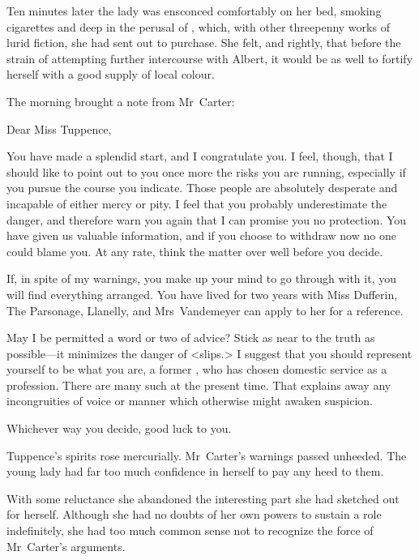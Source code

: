 Ten minutes later the lady was ensconced comfortably on her bed, smoking cigarettes and deep in the perusal of , which, with other threepenny works of lurid fiction, she had sent out to purchase. She felt, and rightly, that before the strain of attempting further intercourse with Albert, it would be as well to fortify herself with a good supply of local colour.

The morning brought a note from Mr~Carter:

\begin{mail}{}{Dear Miss Tuppence,}

You have made a splendid start, and I congratulate you. I feel, though, that I should like to point out to you once more the risks you are running, especially if you pursue the course you indicate. Those people are absolutely desperate and incapable of either mercy or pity. I feel that you probably underestimate the danger, and therefore warn you again that I can promise you no protection. You have given us valuable information, and if you choose to withdraw now no one could blame you. At any rate, think the matter over well before you decide.

If, in spite of my warnings, you make up your mind to go through with it, you will find everything arranged. You have lived for two years with Miss Dufferin, The Parsonage, Llanelly, and Mrs~Vandemeyer can apply to her for a reference.

May I be permitted a word or two of advice? Stick as near to the truth as possible—it minimizes the danger of <slips.> I suggest that you should represent yourself to be what you are, a former , who has chosen domestic service as a profession. There are many such at the present time. That explains away any incongruities of voice or manner which otherwise might awaken suspicion.

Whichever way you decide, good luck to you.

\end{mail}

Tuppence's spirits rose mercurially. Mr~Carter's warnings passed unheeded. The young lady had far too much confidence in herself to pay any heed to them.

With some reluctance she abandoned the interesting part she had sketched out for herself. Although she had no doubts of her own powers to sustain a role indefinitely, she had too much common sense not to recognize the force of Mr~Carter's arguments.


